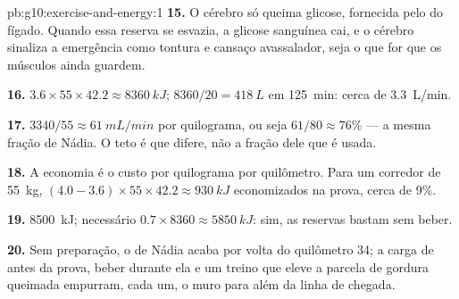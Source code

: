 \begin{solution}{pb:g10:exercise-and-energy:1}
\textbf{15.} O cérebro só queima glicose, fornecida pelo  do
fígado. Quando essa reserva se esvazia, a glicose sanguínea cai, e o
cérebro sinaliza a emergência como tontura e cansaço avassalador, seja
o que for que os músculos ainda guardem.

\textbf{16.} $3.6 \times 55 \times 42.2 \approx \qty{8360}{kJ}$;
$8360/20 = \qty{418}{L}$ em \qty{125}{min}: cerca de \qty{3.3}{L/min}.

\textbf{17.} $3340/55 \approx \qty{61}{mL/min}$ por quilograma, ou seja
$61/80 \approx 76\%$ --- a mesma fração de Nádia. O teto é que difere,
não a fração dele que é usada.

\textbf{18.} A economia é o custo por quilograma por quilômetro. Para um
corredor de \qty{55}{kg}, $(4.0 - 3.6) \times 55 \times 42.2 \approx
\qty{930}{kJ}$ economizados na prova, cerca de 9\%.

\textbf{19.}  \qty{8500}{kJ};  necessário $0.7 \times
8360 \approx \qty{5850}{kJ}$: sim, as reservas bastam sem beber.

\textbf{20.} Sem preparação, o  de Nádia acaba por volta do
quilômetro 34; a carga de  antes da prova, beber 
durante ela e um treino que eleve a parcela de gordura queimada
empurram, cada um, o muro para além da linha de chegada.
\end{solution}
